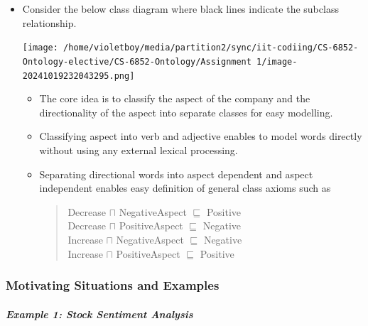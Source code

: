 \documentclass[
]{article}
\begin{document}
\begin{itemize}
\item
  Consider the below class diagram where black lines indicate the
  subclass relationship.

  \texttt{[image: /home/violetboy/media/partition2/sync/iit-codiing/CS-6852-Ontology-elective/CS-6852-Ontology/Assignment 1/image-20241019232043295.png]}

  \begin{itemize}
  \item
    The core idea is to classify the aspect of the company and the
    directionality of the aspect into separate classes for easy
    modelling.
  \item
    Classifying aspect into verb and adjective enables to model words
    directly without using any external lexical processing.
  \item
    Separating directional words into aspect dependent and aspect
    independent enables easy definition of general class axioms such as

    \begin{quote}
    Decrease \(\sqcap\) NegativeAspect \(\sqsubseteq\) Positive\\
    Decrease \(\sqcap\) PositiveAspect \(\sqsubseteq\) Negative\\
    Increase \(\sqcap\) NegativeAspect \(\sqsubseteq\) Negative\\
    Increase \(\sqcap\) PositiveAspect \(\sqsubseteq\) Positive
    \end{quote}
  \end{itemize}
\end{itemize}

\subsubsection{Motivating Situations and
Examples}\label{motivating-situations-and-examples}

\subparagraph{Example 1: Stock Sentiment
Analysis}\label{example-1-stock-sentiment-analysis}
\end{document}
